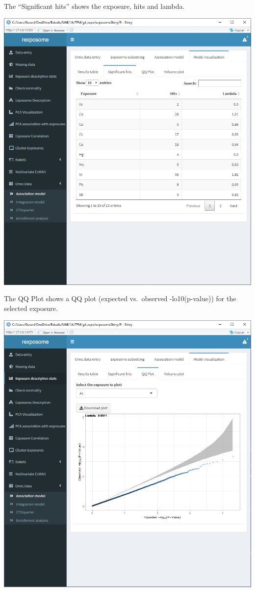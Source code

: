 \documentclass[
]{book}
\begin{document}
The ``Significant hits'' shows the exposure, hits and lambda.

\includegraphics{images/analysis9_6.png}

The QQ Plot shows a QQ plot (expected vs.~observed -lo10(p-value)) for the selected exposure.

\includegraphics{images/analysis9_7.png}
\end{document}
